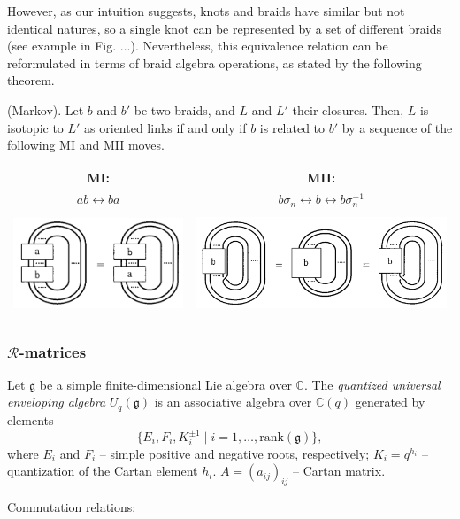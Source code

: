 \documentclass[12pt,a4paper]{article}
\begin{document}
However, as our intuition suggests, knots and braids have similar but not identical natures, so a single knot can be represented by a set of different braids (see example in Fig. ...). Nevertheless, this equivalence relation can be reformulated in terms of braid algebra operations, as stated by the following theorem.
\begin{tcolorbox}
\begin{theorem}\label{thm:Alexander}
   (Markov).  Let $b$ and $b'$ be two braids, and $L$ and $L'$ their closures.
Then, $L$ is isotopic to $L'$ as oriented links if and only if $b$ is related to $b'$ by a
sequence of the following MI and MII moves.

\begin{center}
\begin{tabular}{c c}
\textbf{MI:} & \textbf{MII:} \\
$ab \longleftrightarrow ba$ & $b \sigma_n \longleftrightarrow b \longleftrightarrow b \sigma_n^{-1}$ \\[2mm]  
\includegraphics[height=3cm]{../img/MI.png} &
\includegraphics[height=3cm]{../img/MII.png}
\end{tabular}
\end{center}

\end{theorem}
\end{tcolorbox} 

\subsubsection{$\mathcal{R}$-matrices}
\begin{tcolorbox}
\begin{definition}
    Let $\mathfrak{g}$ be a simple finite-dimensional Lie algebra over $\mathbb{C}$. 
The \emph{quantized universal enveloping algebra} $U_q(\mathfrak{g})$ is an associative algebra over $\mathbb{C}(q)$ generated by elements
\[
\{ E_i, F_i, K_i^{\pm 1} \mid i = 1, \dots, \mathrm{rank}(\mathfrak{g}) \},\] 
where $E_i$ and $F_i$ -- simple positive and negative roots, respectively; $K_i = q^{h_i}$ -- quantization of the Cartan element $h_i$. $A = (a_{ij})_{ij}$ -- Cartan matrix.

Commutation relations:




\end{definition}
\end{tcolorbox}
\end{document}
